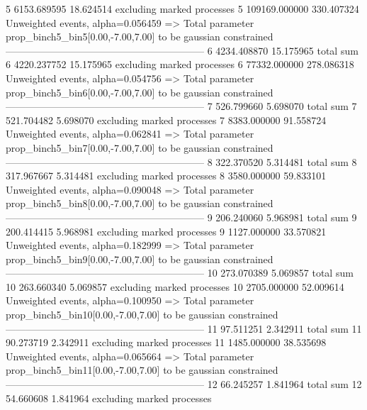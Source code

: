 5          6153.689595     18.624514       excluding marked processes    
5          109169.000000   330.407324      Unweighted events, alpha=0.056459
  => Total parameter prop_binch5_bin5[0.00,-7.00,7.00] to be gaussian constrained
------------------------------------------------------------
6          4234.408870     15.175965       total sum                     
6          4220.237752     15.175965       excluding marked processes    
6          77332.000000    278.086318      Unweighted events, alpha=0.054756
  => Total parameter prop_binch5_bin6[0.00,-7.00,7.00] to be gaussian constrained
------------------------------------------------------------
7          526.799660      5.698070        total sum                     
7          521.704482      5.698070        excluding marked processes    
7          8383.000000     91.558724       Unweighted events, alpha=0.062841
  => Total parameter prop_binch5_bin7[0.00,-7.00,7.00] to be gaussian constrained
------------------------------------------------------------
8          322.370520      5.314481        total sum                     
8          317.967667      5.314481        excluding marked processes    
8          3580.000000     59.833101       Unweighted events, alpha=0.090048
  => Total parameter prop_binch5_bin8[0.00,-7.00,7.00] to be gaussian constrained
------------------------------------------------------------
9          206.240060      5.968981        total sum                     
9          200.414415      5.968981        excluding marked processes    
9          1127.000000     33.570821       Unweighted events, alpha=0.182999
  => Total parameter prop_binch5_bin9[0.00,-7.00,7.00] to be gaussian constrained
------------------------------------------------------------
10         273.070389      5.069857        total sum                     
10         263.660340      5.069857        excluding marked processes    
10         2705.000000     52.009614       Unweighted events, alpha=0.100950
  => Total parameter prop_binch5_bin10[0.00,-7.00,7.00] to be gaussian constrained
------------------------------------------------------------
11         97.511251       2.342911        total sum                     
11         90.273719       2.342911        excluding marked processes    
11         1485.000000     38.535698       Unweighted events, alpha=0.065664
  => Total parameter prop_binch5_bin11[0.00,-7.00,7.00] to be gaussian constrained
------------------------------------------------------------
12         66.245257       1.841964        total sum                     
12         54.660608       1.841964        excluding marked processes    
